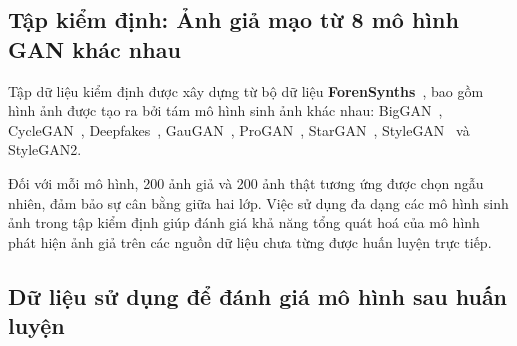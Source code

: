 

\subsection{Tập kiểm định: Ảnh giả mạo từ 8 mô hình GAN khác nhau}
%
\label{ssec:tap_kiem_dinh}
%
Tập dữ liệu kiểm định được xây dựng từ bộ dữ liệu \textbf{ForenSynths}~\cite{Wang2019CNNGeneratedIA}, bao gồm hình ảnh được tạo ra bởi tám mô hình sinh ảnh khác nhau: BigGAN~\cite{brock2018large}, CycleGAN~\cite{zhu2017unpaired}, Deepfakes~\cite{CaliforniaDeepfakes}, GauGAN~\cite{park2019SPADE}, ProGAN~\cite{karras2018progressive}, StarGAN~\cite{choi2018stargan}, StyleGAN~\cite{karras2019style} và StyleGAN2\cite{Karras2019AnalyzingAI}.  

Đối với mỗi mô hình, 200 ảnh giả và 200 ảnh thật tương ứng được chọn ngẫu nhiên, đảm bảo sự cân bằng giữa hai lớp. Việc sử dụng đa dạng các mô hình sinh ảnh trong tập kiểm định giúp đánh giá khả năng tổng quát hoá của mô hình phát hiện ảnh giả trên các nguồn dữ liệu chưa từng được huấn luyện trực tiếp.

\subsection{Dữ liệu sử dụng để đánh giá mô hình sau huấn luyện}

